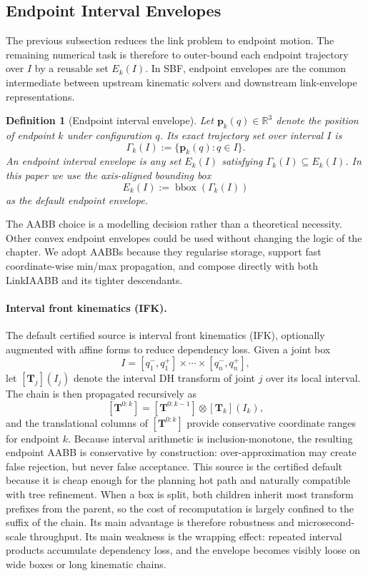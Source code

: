 \documentclass[journal]{IEEEtran}
\DeclareRobustCommand{\textsc}[1]{\textnormal{\MakeUppercase{#1}}}
\newtheorem{definition}{Definition}
\newcommand{\sbf}{\textsc{SBF}}
\newcommand{\Real}{\ensuremath{\mathbb{R}}}
\begin{document}
\subsection{Endpoint Interval Envelopes}\label{sec:rewrite_endpoint_env}

The previous subsection reduces the link problem to endpoint motion. The
remaining numerical task is therefore to outer-bound each endpoint trajectory
over $I$ by a reusable set $E_k(I)$. In \sbf{}, endpoint envelopes are the
common intermediate between upstream kinematic solvers and downstream
link-envelope representations.

\begin{definition}[Endpoint interval envelope]\label{def:endpoint_env}
Let $\bm{p}_k(q) \in \Real^3$ denote the position of endpoint $k$ under
configuration $q$. Its exact trajectory set over interval $I$ is
\[
\Gamma_k(I) := \{\bm{p}_k(q) : q\in I\}.
\]
An endpoint interval envelope is any set $E_k(I)$ satisfying
$\Gamma_k(I) \subseteq E_k(I)$. In this paper we use the axis-aligned bounding
box
\[
E_k(I) := \operatorname{bbox}(\Gamma_k(I))
\]
as the default endpoint envelope.
\end{definition}

The AABB choice is a modelling decision rather than a theoretical necessity.
Other convex endpoint envelopes could be used without changing the logic of the
chapter. We adopt AABBs because they regularise storage, support fast
coordinate-wise min/max propagation, and compose directly with both LinkIAABB
and its tighter descendants.

\paragraph{Interval front kinematics (IFK).}
The default certified source is interval front kinematics (IFK), optionally
augmented with affine forms to reduce dependency loss. Given a joint box
\[
I = [q_1^-,q_1^+] \times \cdots \times [q_n^-,q_n^+],
\]
let $[\bm{T}_j](I_j)$ denote the interval DH transform of joint $j$ over its
local interval. The chain is then propagated recursively as
\[
[\bm{T}^{0:k}] = [\bm{T}^{0:k-1}] \otimes [\bm{T}_k](I_k),
\]
and the translational columns of $[\bm{T}^{0:k}]$ provide conservative
coordinate ranges for endpoint $k$. Because interval arithmetic is
inclusion-monotone, the resulting endpoint AABB is conservative by
construction: over-approximation may create false rejection, but never false
acceptance. This source is the certified default because it is cheap enough for
the planning hot path and naturally compatible with tree refinement. When a box
is split, both children inherit most transform prefixes from the parent, so the
cost of recomputation is largely confined to the suffix of the chain. Its main
advantage is therefore robustness and microsecond-scale throughput. Its main
weakness is the wrapping effect: repeated interval products accumulate
dependency loss, and the envelope becomes visibly loose on wide boxes or long
kinematic chains.
\end{document}
